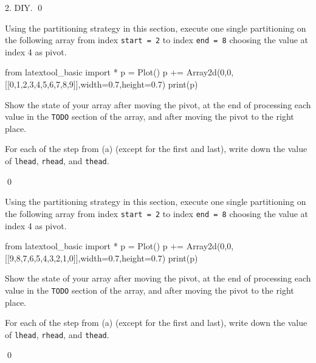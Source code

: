 2. DIY.
\qed


\newpage
\begin{ex}
\begin{tightlist}
\item Using the partitioning strategy in this section,
execute one single partitioning on the following array
from index \verb!start = 2! to index \verb!end = 8!
choosing the value at index 4 as pivot.

\begin{python}
from latextool_basic import *
p = Plot()
p += Array2d(0,0,[[0,1,2,3,4,5,6,7,8,9]],width=0.7,height=0.7)
print(p)
\end{python}

Show the state of your array after moving the pivot, at the end of
processing each value in the \verb!TODO! section of the array,
and after moving the pivot to the right place.
\item For each of the step from (a) (except for the first and last),
write down the value of \verb!lhead!, \verb!rhead!, and \verb!thead!.
\end{tightlist}
\qed
\end{ex}


\newpage
\begin{ex}
\begin{tightlist}
\item Using the partitioning strategy in this section,
execute one single partitioning on the following array
from index \verb!start = 2! to index \verb!end = 8!
choosing the value at index 4 as pivot.

\begin{python}
from latextool_basic import *
p = Plot()
p += Array2d(0,0,[[9,8,7,6,5,4,3,2,1,0]],width=0.7,height=0.7)
print(p)
\end{python}

Show the state of your array after moving the pivot, at the end of
processing each value in the \verb!TODO! section of the array,
and after moving the pivot to the right place.
\item For each of the step from (a) (except for the first and last),
write down the value of \verb!lhead!, \verb!rhead!, and \verb!thead!.
\end{tightlist}
\qed
\end{ex}

